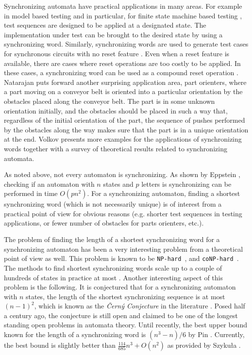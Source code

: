 \documentclass[12pt]{article}
\newcommand{\NPHARD}{{\tt NP-hard}}
\newcommand{\coNPHARD}{{\tt coNP-hard}}
\begin{document}
Synchronizing automata have practical applications in many areas. For example in model based testing \cite{Broy05} and in particular, for finite state machine based testing \cite{LY96}, test sequences are designed to be applied at a designated state. The implementation under test can be brought to the desired state by using a synchronizing word. Similarly, synchronizing words are used to generate test cases for synchronous circuits with no reset feature \cite{Cho93}. Even when a reset feature is available, there are cases where reset operations are too costly to be applied. In these cases, a synchronizing word can be used as a compound reset operation \cite{JUY15}. Natarajan \cite{Natarajan86} puts forward another surprising application area, part orienters, where a part moving on a conveyor belt is oriented into a particular orientation by the obstacles placed along the conveyor belt. The part is in some unknown orientation initially, and the obstacles should be placed in such a way that, regardless of the initial orientation of the part, the sequence of pushes performed by the obstacles along the way makes sure that the part is in a unique orientation at the end. Volkov \cite{Volkov08} presents more examples for the applications of synchronizing words together with a survey of theoretical results related to synchronizing automata.

As noted above, not every automaton is synchronizing. As shown by Eppstein \cite{Eppstein90}, checking if an automaton with $n$ states and $p$ letters is synchronizing can be performed in time $O(pn^2)$. For a synchronizing automaton, finding a shortest synchronizing word (which is not necessarily unique) is of interest from a practical point of view for obvious reasons (e.g. shorter test sequences in testing applications, or fewer number of obstacles for parts orienters, etc.).

The problem of finding the length of a shortest synchronizing word for a synchronizing automaton has been a very interesting problem from a theoretical point of view as well. This problem is known to be \NPHARD\ \cite{Eppstein90}, and \coNPHARD\ \cite{OU10}. The methods to find shortest synchronizing words scale up to a couple of hundreds of states in practice at most \cite{KKS15}. Another interesting aspect of this problem is the following. It is conjectured that for a synchronizing automaton with $n$ states, the length of the shortest synchronizing sequence is at most $(n-1)^2$, which is known as the {\em \v{C}ern\'y Conjecture} in the literature \cite{Cerny64, Cerny71}. Posed half a century ago, the conjecture is still open and claimed to be one of the longest standing open problems in automata theory. Until recently, the best upper bound known for the length of a synchronizing word is $(n^3 - n)/6$ by Pin \cite{Pin83}. Currently, the best bound is slightly better than $\frac{114}{685}n^3 + O(n^2)$ as provided by Szyku{\l}a \cite{Szykula17}.
\end{document}
